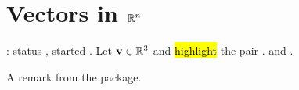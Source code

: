 \documentclass[11pt]{lmdreport}
\begin{document}
\section{Vectors in $\mathbb{R}^n$}
\showcourse: status \status, started \started.
Let $\mathbf{v} \in \mathbb{R}^3$ and \hl{highlight} the pair .
 and .
\exercise{} \exercise{}
\begin{remark}
A remark from the package.
\end{remark}
\end{document}
